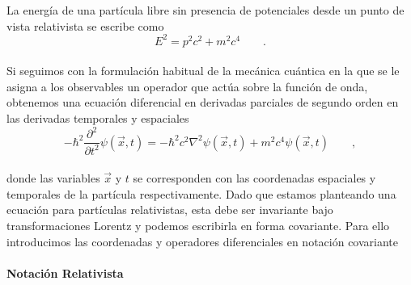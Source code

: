 \documentclass[11pt,letterpaper]{article}     %
\begin{document}
La energía de una partícula libre sin presencia de potenciales desde un punto de vista relativista se escribe como
\begin{equation} \label{eq:1}
E^2=p^2c^2+m^2c^4 \qquad .
\end{equation}
\\Si seguimos con la formulación habitual de la mecánica cuántica en la que se le asigna a los observables un operador que actúa sobre la función de onda, obtenemos una ecuación diferencial en derivadas parciales de segundo orden en las derivadas temporales y espaciales
\begin{equation}\label{eq:2}
- \hbar^2 \frac{\partial^2}{\partial  t^2} \psi(\vec{x},t) =  -\hbar^2 c^2 \nabla^2 \psi(\vec{x},t) + m^2c^4  \psi(\vec{x},t)\qquad ,
\end{equation}
\\donde las variables $\vec{x}$ y $t$ se corresponden con las coordenadas espaciales y temporales de la partícula respectivamente. Dado que estamos planteando una ecuación para partículas relativistas, esta debe ser invariante bajo transformaciones Lorentz y podemos escribirla en forma covariante. Para ello introducimos las coordenadas y operadores diferenciales en notación covariante \\ \\




\textbf{Notación Relativista} \\ \\
\end{document}
